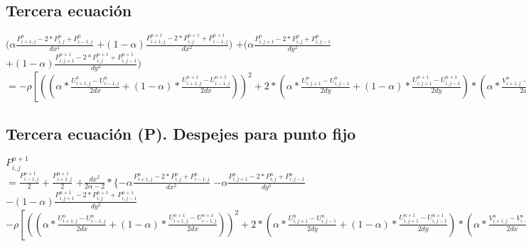 \documentclass[a4paper]{article}
\begin{document}
\subsection{Tercera ecuación}
 $(\alpha \frac{P^{n}_{i+1,j} -2*P^{n}_{i,j} + P^{n}_{i-1,j}}{dx^{2}}$
 $+(1-\alpha) \frac{P^{n+1}_{i+1,j} -2*P^{n+1}_{i,j} + P^{n+1}_{i-1,j}}{dx^{2}})$
 $+(\alpha \frac{P^{n}_{i,j+1} -2*P^{n}_{i,j} + P^{n}_{i,j-1}}{dy^{2}}$ 
 $+(1-\alpha) \frac{P^{n+1}_{i,j+1} -2*P^{n+1}_{i,j} + P^{n+1}_{i,j-1}}{dy^{2}})$
 $= -\rho [ ((\alpha * \frac{U^{n}_{i+1,j} - U^{n}_{i-1,j}}{2dx} + (1-\alpha) * \frac{U^{n+1}_{i+1,j} - U^{n+1}_{i-1,j}}{2dx}))^{2} + 2 * (\alpha * \frac{U^{n}_{i,j+1} - U^{n}_{i,j-1}}{2dy} + (1- \alpha) * \frac{U^{n+1}_{i,j+1} - U^{n+1}_{i,j-1}}{2dy}) * (\alpha * \frac{V^{n}_{i+1,j}-V^{n}_{i-1,j}}{2dx} + (1-\alpha) (\frac{V^{n+1}_{i+1,j}-V^{n+1}_{i-1,j}}{2dx})) + ((\alpha * \frac{V^{n}_{i,j+1} - V^{n}_{i,j-1}}{2dy} + (1-\alpha) * \frac{V^{n+1}_{i,j+1} - V^{n+1}_{i,j-1}}{2dy}))^{2}]$


\subsection{Tercera ecuación (P). Despejes para punto fijo}
 
 $ P^{n+1}_{i,j} $
\\
$= \frac{P^{n+1}_{i-1,j}}{2} + \frac{P^{n+1}_{i+1,j}}{2} $
 $ + \frac{dx^{2}}{2\alpha-2} * \{-\alpha \frac{P^{n}_{i+1,j} -2*P^{n}_{i,j} + P^{n}_{i-1,j}}{dx^{2}}$
 $ -\alpha \frac{P^{n}_{i,j+1} -2*P^{n}_{i,j} + P^{n}_{i,j-1}}{dy^{2}}$ 
 $-(1-\alpha) \frac{P^{n+1}_{i,j+1} -2*P^{n+1}_{i,j} + P^{n+1}_{i,j-1}}{dy^{2}}$
 $ -\rho [ ((\alpha * \frac{U^{n}_{i+1,j} - U^{n}_{i-1,j}}{2dx} + (1-\alpha) * \frac{U^{n+1}_{i+1,j} - U^{n+1}_{i-1,j}}{2dx}))^{2} + 2 * (\alpha * \frac{U^{n}_{i,j+1} - U^{n}_{i,j-1}}{2dy} + (1- \alpha) * \frac{U^{n+1}_{i,j+1} - U^{n+1}_{i,j-1}}{2dy}) * (\alpha * \frac{V^{n}_{i+1,j}-V^{n}_{i-1,j}}{2dx} + (1-\alpha) (\frac{V^{n+1}_{i+1,j}-V^{n+1}_{i-1,j}}{2dx})) + ((\alpha * \frac{V^{n}_{i,j+1} - V^{n}_{i,j-1}}{2dy} + (1-\alpha) * \frac{V^{n+1}_{i,j+1} - V^{n+1}_{i,j-1}}{2dy}))^{2}] \} $
 
 
\end{document}
